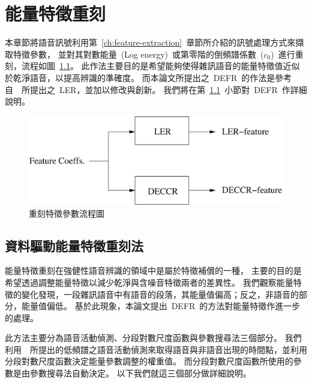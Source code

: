 \chapter{能量特徵重刻}
\label{ch:rescale-method}
本章節將語音訊號利用第~\ref{ch:feature-extraction}~章節所介紹的訊號處理方式來擷取特徵參數，
並對其對數能量~(Log energy)~或第零階的倒頻譜係數~($c_0$)~進行重刻，流程如圖~\ref{fig:rescale}。
此作法主要目的是希望能夠使得雜訊語音的能量特徵值近似於乾淨語音，以提高辨識的準確度。
而本論文所提出之~DEFR~的作法是參考自~\cite{chen2007}~所提出之~LER，並加以修改與創新。
我們將在第~\ref{sec:ddt-rescaling}~小節對~DEFR~作詳細說明。 

\begin{figure}[!htb]
\centering
\includegraphics[width=1.0\textwidth]{figs/rescale}
\caption{重刻特徵參數流程圖} 
\label{fig:rescale}
\end{figure}

\section{資料驅動能量特徵重刻法}
\label{sec:ddt-rescaling}
能量特徵重刻在強健性語音辨識的領域中是屬於特徵補償的一種，
主要的目的是希望透過調整能量特徵以減少乾淨與含噪音特徵兩者的差異性。
我們觀察能量特徵的變化發現，一段雜訊語音中有語音的段落，其能量值偏高；反之，非語音的部分，能量值偏低。
基於此現象，本論文提出~DEFR~的方法對能量特徵作進一步的處理。

此方法主要分為語音活動偵測、分段對數尺度函數與參數搜尋法三個部分。
我們利用~\cite{tu2007}~所提出的低頻譜之語音活動偵測來取得語音與非語音出現的時間點，並利用分段對數尺度函數決定能量參數調整的權重值。
而分段對數尺度函數所使用的參數是由參數搜尋法自動決定。
以下我們就這三個部分做詳細說明。

